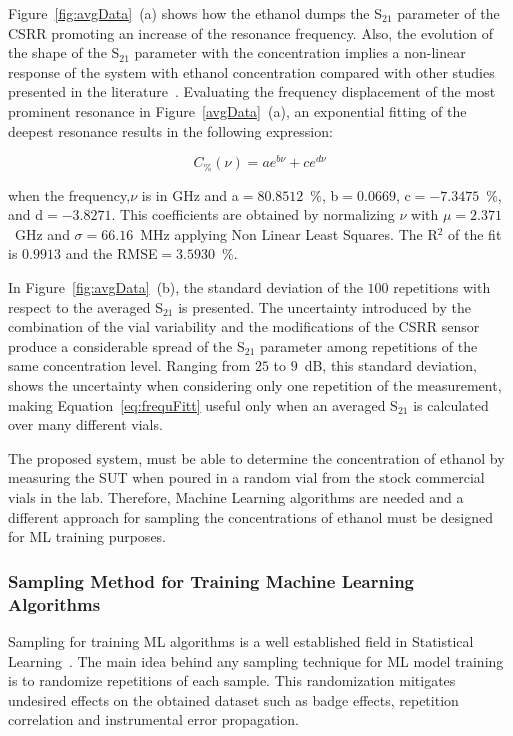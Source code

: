 \documentclass[journal,twoside,web]{ieeecolor}
\begin{document}
Figure~\ref{fig:avgData}~(a) shows how the ethanol dumps the S$_{21}$ parameter of the CSRR promoting an increase of the resonance frequency. Also, the evolution of the shape of the S$_{21}$ parameter with the concentration implies a non-linear response of the system with ethanol concentration compared with other studies presented in the literature~\cite{Abdolrazzaghi2023}. Evaluating the frequency displacement of the most prominent resonance in Figure~\ref{avgData}~(a), an exponential fitting of the deepest resonance results in the following expression:

\begin{equation}
	\label{eq:frequFitt}
	 C_{\%}(\nu) = ae^{b\nu}+ce^{d\nu} 
\end{equation} 

when the frequency,$\nu$ is in GHz and a$=80.8512$~$\%$, b$=0.0669$, c$=-7.3475$~$\%$, and d$=-3.8271$. This coefficients are obtained by normalizing $\nu$ with $\mu=2.371$~GHz and $\sigma=66.16$~MHz applying Non Linear Least Squares. The R$^{2}$ of the fit is $0.9913$ and the RMSE$=3.5930$~$\%$. 
  
In Figure~\ref{fig:avgData}~(b), the standard deviation of the $100$ repetitions with respect to the averaged S$_{21}$ is presented. The uncertainty introduced by the combination of the vial variability and the modifications of the CSRR sensor produce a considerable spread of the S$_{21}$ parameter among repetitions of the same concentration level. Ranging from $25$ to $9$~dB, this standard deviation, shows the uncertainty when considering only one repetition of the measurement, making Equation~\ref{eq:frequFitt} useful only when an averaged S$_{21}$ is calculated over many different vials.

The proposed system, must be able to determine the concentration of ethanol by measuring the SUT when poured in a random vial from the stock commercial vials in the lab. Therefore, Machine Learning algorithms are needed and a different approach for sampling the concentrations of ethanol must be designed for ML training purposes.
\\
\subsubsection{Sampling Method for Training Machine Learning Algorithms}
\label{sssec:samplingML}

Sampling for training ML algorithms is a well established field in Statistical Learning~\cite{Wu2020}. The main idea behind any sampling technique for ML model training is to randomize repetitions of each sample. This randomization mitigates undesired effects on the obtained dataset such as badge effects, repetition correlation and instrumental error propagation. 
\end{document}
